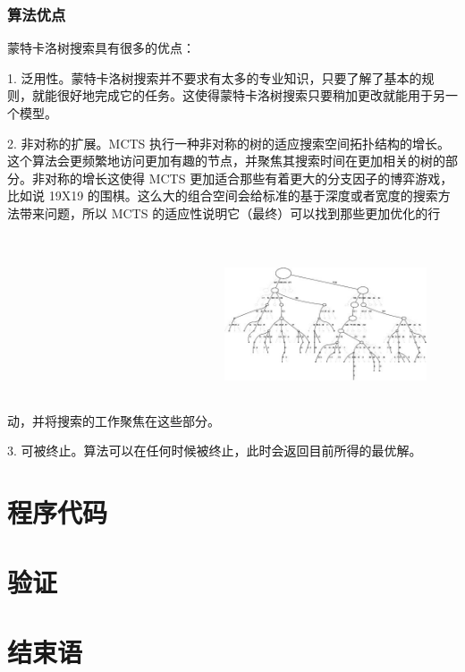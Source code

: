 \documentclass[a4paper]{article}
\begin{document}
\begin{multicols}{2}
\subsubsection{算法优点}
蒙特卡洛树搜索具有很多的优点\cite{k4}：\par
1.	泛用性。蒙特卡洛树搜索并不要求有太多的专业知识，只要了解了基本的规则，就能很好地完成它的任务。这使得蒙特卡洛树搜索只要稍加更改就能用于另一个模型。\par
2.	非对称的扩展。\cite{k5}MCTS 执行一种非对称的树的适应搜索空间拓扑结构的增长。这个算法会更频繁地访问更加有趣的节点，并聚焦其搜索时间在更加相关的树的部分。非对称的增长这使得 MCTS 更加适合那些有着更大的分支因子的博弈游戏，比如说 19X19 的围棋。这么大的组合空间会给标准的基于深度或者宽度的搜索方法带来问题，所以 MCTS 的适应性说明它（最终）可以找到那些更加优化的行动，并将搜索的工作聚焦在这些部分。
\includegraphics[width=6cm,height=6cm]{k4.jpg}
\par
3.	可被终止。算法可以在任何时候被终止，此时会返回目前所得的最优解。\cite{k6}\par



    \section{程序代码}

    \section{验证}

    \section{结束语}


\end{multicols}
\end{document}
